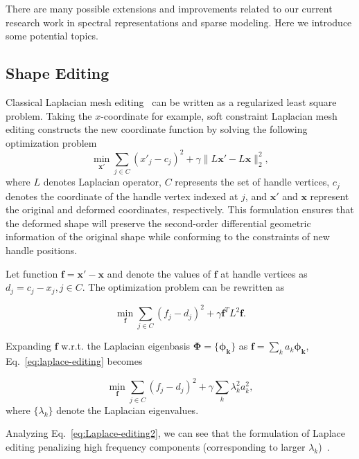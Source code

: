 There are many possible extensions and improvements related to our current research
work in spectral representations and sparse modeling. Here we introduce some
potential topics.

\subsection*{Shape Editing}

Classical Laplacian mesh editing~\cite{Botsch2008} can be written as a regularized least square
problem. Taking the $x$-coordinate for example, soft constraint Laplacian mesh editing
constructs the new coordinate function by solving the following optimization problem
\begin{equation}
\min_\mathbf{x'} \sum_{j\in C} (x'_j - c_j)^2 + \gamma\|L\mathbf{x'}-L\mathbf{x}\|_2^2,
\end{equation}
where $L$ denotes Laplacian operator, $C$ represents the set of handle vertices, $c_j$ denotes the
coordinate of the handle vertex indexed at $j$, and $\mathbf{x'}$ and $\mathbf{x}$ represent the
original and deformed coordinates, respectively. This formulation ensures that the deformed shape
will preserve the second-order differential geometric information of the original shape while
conforming to the constraints of new handle positions.

Let function $\mathbf{f}=\mathbf{x'}-\mathbf{x}$ and denote the values of $\mathbf{f}$ at
handle vertices as $d_j = c_j - x_j, j\in C$. The optimization problem can be rewritten as

\begin{equation}
\label{eq:laplace-editing}
\min_\mathbf{f} \sum_{j\in C} (f_j - d_j)^2 + \gamma \mathbf{f}^T L^2 \mathbf{f}.
\end{equation}

Expanding $\mathbf{f}$ w.r.t. the Laplacian eigenbasis $\mathbf{\Phi}=\{\mathbf{\phi_k}\}$
as $\mathbf{f}=\sum_k a_k \mathbf{\phi_k}$, Eq.~\ref{eq:laplace-editing} becomes

\begin{equation}
\label{eq:Laplace-editing2}
\min_\mathbf{f} \sum_{j\in C} (f_j - d_j)^2 + \gamma \sum_k \lambda_k^2 a_k^2,
\end{equation}
where $\{\lambda_k\}$ denote the Laplacian eigenvalues.

Analyzing Eq.~\ref{eq:Laplace-editing2}, we can see that the formulation of Laplace
editing penalizing high frequency components (corresponding to larger
$\lambda_k$)~\cite{Rustamov:2009:ICMS}.

